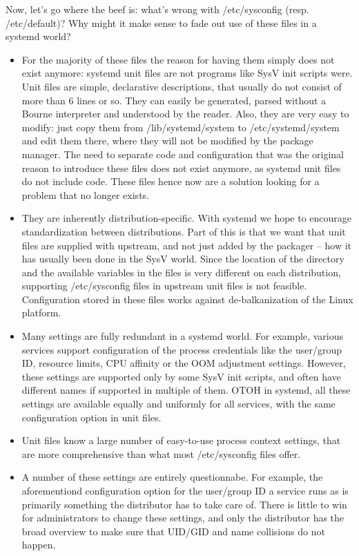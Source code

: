 \documentclass[titlepage]{article}
\begin{document}
Now, let's go where the beef is: what's wrong with /etc/sysconfig (resp. /etc/default)? Why might it make sense to fade out use of these files in a systemd world?
\begin{itemize}
\item For the majority of these files the reason for having them simply does not exist anymore: systemd unit files are not programs like SysV init scripts were. Unit files are simple, declarative descriptions, that usually do not consist of more than 6 lines or so. They can easily be generated, parsed without a Bourne interpreter and understood by the reader. Also, they are very easy to modify: just copy them from /lib/systemd/system to /etc/systemd/system and edit them there, where they will not be modified by the package manager. The need to separate code and configuration that was the original reason to introduce these files does not exist anymore, as systemd unit files do not include code. These files hence now are a solution looking for a problem that no longer exists.
\item They are inherently distribution-specific. With systemd we hope to encourage standardization between distributions. Part of this is that we want that unit files are supplied with upstream, and not just added by the packager -- how it has usually been done in the SysV world. Since the location of the directory and the available variables in the files is very different on each distribution, supporting /etc/sysconfig files in upstream unit files is not feasible. Configuration stored in these files works against de-balkanization of the Linux platform.
\item Many settings are fully redundant in a systemd world. For example, various services support configuration of the process credentials like the user/group ID, resource limits, CPU affinity or the OOM adjustment settings. However, these settings are supported only by some SysV init scripts, and often have different names if supported in multiple of them. OTOH in systemd, all these settings are available equally and uniformly for all services, with the same configuration option in unit files.
\item Unit files know a large number of easy-to-use process context settings, that are more comprehensive than what most /etc/sysconfig files offer.
\item A number of these settings are entirely questionnabe. For example, the aforementiond configuration option for the user/group ID a service runs as is primarily something the distributor has to take care of. There is little to win for administrators to change these settings, and only the distributor has the broad overview to make sure that UID/GID and name collisions do not happen.

\end{itemize}
\end{document}
